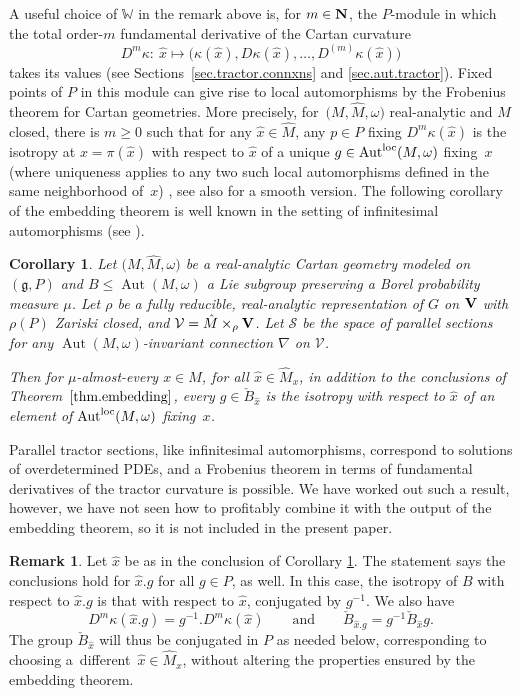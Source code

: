 \documentclass[pdftex]{sigma}
\numberwithin{equation}{section}
\newtheorem{cor}[thm]{Corollary}
\theoremstyle{definition}
\newtheorem{rem}[thm]{Remark}
\def\V{{\bf V}}
\newcommand{\lieg}{\mathfrak{g}}
\newcommand{\Aut}{\operatorname{Aut}}
\begin{document}
A useful choice of $\mathbb{W}$ in the remark above is, for $m \in {\bf N}$, the $P$-module in which the total
order-$m$ fundamental derivative of the Cartan curvature
\[D^m \kappa\colon \ \hat{x} \mapsto \bigl( \kappa(\hat{x}), D \kappa(\hat{x}), \dots, D^{(m)} \kappa(\hat{x}) \bigr)\]
takes its
values (see Sections~\ref{sec.tractor.connxns} and \ref{sec.aut.tractor}). Fixed points of $P$ in this module can give rise to local automorphisms
by the Frobenius theorem for Cartan geometries. More precisely, for~$\bigl(M,\hat{M}, \omega\bigr)$ real-analytic and $M$ closed, there is $m \geq 0$ such that for any $\hat{x} \in \hat{M}$, any $p \in P$ fixing $D^m \kappa(\hat{x})$ is the isotropy at $x = \pi(\hat{x})$ with respect to $\hat{x}$ of a unique $g \in \Aut^{\rm loc}(M,\omega)$ fixing~$x$ (where uniqueness applies to any two such local automorphisms defined in the same neighborhood of~$x$) \cite{me.frobenius}, see also \cite{pecastaing.frobenius} for a smooth version. The following corollary of the embedding theorem is well known in the setting of infinitesimal automorphisms (see \cite[Theorem~5.3]{me.frobenius}).

\begin{cor}
\label{cor.emb.frob}
Let
$\bigl(M, \hat{M},\omega\bigr)$ be a real-analytic Cartan geometry modeled on $(\lieg,P)$ and $B \leq \Aut(M,\omega)$ a Lie subgroup preserving a Borel probability measure $\mu$.
Let $\rho$ be a fully reducible, real-analytic representation of $G$ on $\V$ with $\rho(P)$ Zariski closed, and $\mathcal{V} = \hat{M}
 \times_\rho \V$. Let $\mathcal{S}$ be the space of parallel sections for any $\Aut(M,\omega)$-invariant connection $\nabla$ on $\mathcal{V}$.

 Then for $\mu$-almost-every $x \in M$, for all $\hat{x} \in \hat{M}_x$, in addition to the conclusions of Theorem~$\ref{thm.embedding}$, every $g \in \check{B}_{\hat{x}}$ is the isotropy with respect to $\hat{x}$ of an element of $\Aut^{{\rm loc}}(M,\omega)$ fixing~$x$.
\end{cor}

Parallel tractor sections, like infinitesimal automorphisms, correspond to solutions of overdetermined PDEs, and a Frobenius theorem in terms of fundamental derivatives of the tractor curvature is possible. We have worked out such a result, however, we have not seen how to profitably combine it with the output of the embedding theorem, so it is not included in the present paper.

\begin{rem}
\label{rem.conjugate.embedding}
Let $\hat{x}$ be as in the conclusion of Corollary \ref{cor.emb.frob}. The statement says the conclusions hold for $\hat{x}.g$ for all $g \in P$, as well. In this case, the isotropy of $B$ with respect to $\hat{x}.g$ is that with respect to $\hat{x}$, conjugated by $g^{-1}$. We also have
\[D^m \kappa(\hat{x}.g) = g^{-1}. D^m \kappa(\hat{x}) \qquad \mbox{and} \qquad \check{B}_{\hat{x}.g} = g^{-1} \check{B}_{\hat{x}} g.\]
The group $\check{B}_{\hat{x}}$ will thus be conjugated in $P$ as needed below, corresponding to choosing a~different~${\hat{x} \in \hat{M}_x}$, without altering the properties ensured by the embedding theorem.
\end{rem}
\end{document}
